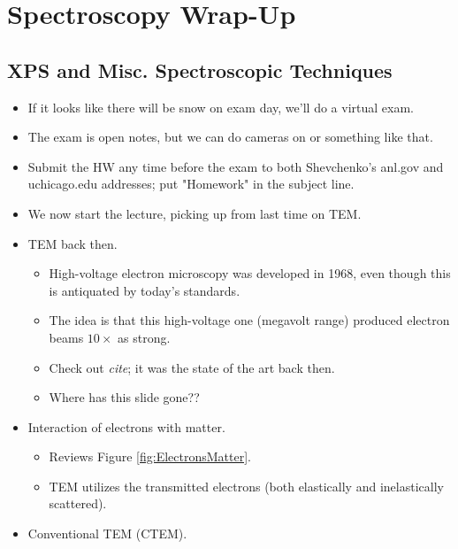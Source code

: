\documentclass[../notes.tex]{subfiles}
\begin{document}
\chapter{Spectroscopy Wrap-Up}
\section{XPS and Misc. Spectroscopic Techniques}
\begin{itemize}
    \item {}If it looks like there will be snow on exam day, we'll do a virtual exam.
    \item The exam is open notes, but we can do cameras on or something like that.
    \item Submit the HW any time before the exam to both Shevchenko's anl.gov and uchicago.edu addresses; put "Homework" in the subject line.
    \item We now start the lecture, picking up from last time on TEM.
    \item TEM back then.
    \begin{itemize}
        \item High-voltage electron microscopy was developed in 1968, even though this is antiquated by today's standards.
        \item The idea is that this high-voltage one (megavolt range) produced electron beams $10\times$ as strong.
        \item Check out \emph{cite}; it was the state of the art back then.
        \item Where has this slide gone??
    \end{itemize}
    \item Interaction of electrons with matter.
    \begin{itemize}
        \item Reviews Figure \ref{fig:ElectronsMatter}.
        \item TEM utilizes the transmitted electrons (both elastically and inelastically scattered).
    \end{itemize}
    \item Conventional TEM (CTEM).
    \begin{figure}[H]
        \centering
        \begin{subfigure}[b]{0.49\linewidth}
            \centering
\end{subfigure}
\end{figure}
\end{itemize}
\end{document}
